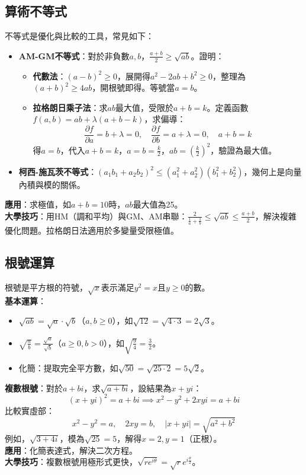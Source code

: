 \subsection{算術不等式}
不等式是優化與比較的工具，常見如下：
\begin{itemize}
    \item \textbf{AM-GM不等式}：對於非負數$a, b$，$\frac{a + b}{2} \geq \sqrt{ab}$。證明：
    \begin{itemize}
        \item \textbf{代數法}：$(a - b)^2 \geq 0$，展開得$a^2 - 2ab + b^2 \geq 0$，整理為$(a + b)^2 \geq 4ab$，開根號即得。等號當$a = b$。
        \item \textbf{拉格朗日乘子法}：求$ab$最大值，受限於$a + b = k$。定義函數$f(a, b) = ab + \lambda (a + b - k)$，求偏導：
        \[
        \frac{\partial f}{\partial a} = b + \lambda = 0, \quad \frac{\partial f}{\partial b} = a + \lambda = 0, \quad a + b = k
        \]
        得$a = b$，代入$a + b = k$，$a = b = \frac{k}{2}$，$ab = \left(\frac{k}{2}\right)^2$，驗證為最大值。
    \end{itemize}
    \item \textbf{柯西-施瓦茨不等式}：$(a_1b_1 + a_2b_2)^2 \leq (a_1^2 + a_2^2)(b_1^2 + b_2^2)$，幾何上是向量內積與模的關係。
\end{itemize}
\textbf{應用}：求極值，如$a + b = 10$時，$ab$最大值為25。\\
\textbf{大學技巧}：用HM（調和平均）與GM、AM串聯：$\frac{2}{\frac{1}{a} + \frac{1}{b}} \leq \sqrt{ab} \leq \frac{a + b}{2}$，解決複雜優化問題。拉格朗日法適用於多變量受限極值。

\subsection{根號運算}
根號是平方根的符號，$\sqrt{x}$表示滿足$y^2 = x$且$y \geq 0$的數。\\
\textbf{基本運算}：
\begin{itemize}
    \item $\sqrt{ab} = \sqrt{a} \cdot \sqrt{b}$（$a, b \geq 0$），如$\sqrt{12} = \sqrt{4 \cdot 3} = 2\sqrt{3}$。
    \item $\sqrt{\frac{a}{b}} = \frac{\sqrt{a}}{\sqrt{b}}$（$a \geq 0, b > 0$），如$\sqrt{\frac{9}{4}} = \frac{3}{2}$。
    \item 化簡：提取完全平方數，如$\sqrt{50} = \sqrt{25 \cdot 2} = 5\sqrt{2}$。
\end{itemize}
\textbf{複數根號}：對於$a + bi$，求$\sqrt{a + bi}$，設結果為$x + yi$：
\[
(x + yi)^2 = a + bi \implies x^2 - y^2 + 2xyi = a + bi
\]
比較實虛部：
\[
x^2 - y^2 = a, \quad 2xy = b, \quad |x + yi| = \sqrt{a^2 + b^2}
\]
例如，$\sqrt{3 + 4i}$，模為$\sqrt{25} = 5$，解得$x = 2, y = 1$（正根）。\\
\textbf{應用}：化簡表達式，解決二次方程。\\
\textbf{大學技巧}：複數根號用極形式更快，$\sqrt{re^{i\theta}} = \sqrt{r}e^{i\frac{\theta}{2}}$。


